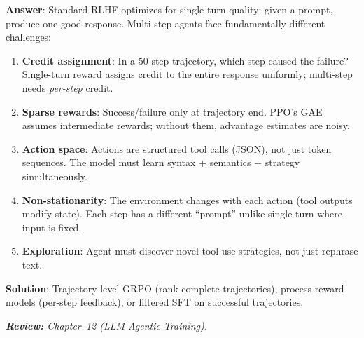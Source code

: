 \begin{questionbox}
\textbf{Answer}: Standard RLHF optimizes for single-turn quality: given a prompt, produce one good response. Multi-step agents face fundamentally different challenges:

\begin{enumerate}
  \item \textbf{Credit assignment}: In a 50-step trajectory, which step caused the failure? Single-turn reward assigns credit to the entire response uniformly; multi-step needs \emph{per-step} credit.
  \item \textbf{Sparse rewards}: Success/failure only at trajectory end. PPO’s GAE assumes intermediate rewards; without them, advantage estimates are noisy.
  \item \textbf{Action space}: Actions are structured tool calls (JSON), not just token sequences. The model must learn syntax + semantics + strategy simultaneously.
  \item \textbf{Non-stationarity}: The environment changes with each action (tool outputs modify state). Each step has a different ``prompt'' unlike single-turn where input is fixed.
  \item \textbf{Exploration}: Agent must discover novel tool-use strategies, not just rephrase text.
\end{enumerate}

\textbf{Solution}: Trajectory-level GRPO (rank complete trajectories), process reward models (per-step feedback), or filtered SFT on successful trajectories.

\emph{\textbf{Review:} Chapter~12 (LLM Agentic Training).}
\end{questionbox}

